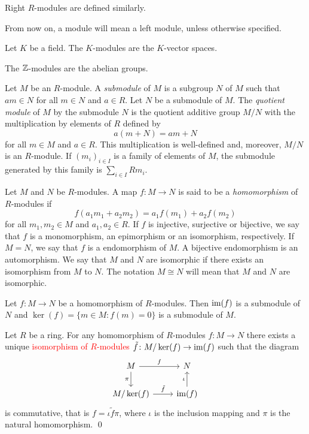 Right $R$-modules are defined similarly.

\begin{convention}
From now on, a module will mean a left module, unless otherwise specified. 
\end{convention}

\begin{example}
	Let $K$ be a field. The  $K$-modules are the $K$-vector spaces.
\end{example}

\begin{example}
    The $\mathbb{Z}$-modules are the abelian groups.
\end{example}

Let $M$ be an $R$-module. A {\em submodule} of $M$ is a subgroup $N$ of $M$
such that $am\in N$ for all $m\in N$ and $a\in R$. Let $N$ be a submodule of $M$. 
The {\em quotient module} 
of $M$ by the submodule $N$ is
the quotient additive group $M/N$ with the multiplication by elements of $R$ defined by
\[
a(m+N)=am+N
\]
for all $m\in M$ and $a\in R$.
This multiplication is well-defined and, moreover, 
$M/N$ is an $R$-module. 
If $(m_i)_{i\in I}$ is a family of elements of $M$, 
the submodule generated by this family is 
$\sum_{i \in I}Rm_i$.

Let $M$ and $N$ be $R$-modules. A map $f\colon M\rightarrow
N$ is said to be a {\em homomorphism} of $R$-modules if
\[
f(a_1m_1+a_2m_2)=a_1f(m_1)+a_2f(m_2)
\]
for all $m_1,m_2\in M$ and $a_1,a_2\in R$.
If $f$ is injective, surjective or bijective, we say that $f$ is
a monomorphism, an epimorphism or an isomorphism, respectively. If $M=N$, we say that
$f$ is a endomorphism of $M$. A bijective endomorphism is an
automorphism. We say that $M$ and $N$ are isomorphic if there exists 
an isomorphism from $M$ to $N$. The notation
$M\cong N$ will mean that $M$ and $N$ are isomorphic.

Let $f\colon M\rightarrow N$ be a homomorphism of $R$-modules. Then
$\operatorname{im}(f)$ is a submodule
of $N$ and $\ker(f)=\{m\in M:f(m)=0\}$ is a submodule of $M$.

 
\begin{theorem}
Let $R$ be a ring.	For any homomorphism of $R$-modules $f\colon M\rightarrow N$ 
there exists a unique \textcolor{red}{isomorphism of $R$-modules}  $\tilde f\colon M/\ker(f)\rightarrow\operatorname{im}(f)$ such that the diagram
	\[\begin{tikzcd}
		{M} & {N} \\
		{M/\ker(f)} & {\im(f)}
		\arrow["f", from=1-1, to=1-2]
		\arrow["{\pi}"', from=1-1, to=2-1]
		\arrow["{\iota}", from=2-2, to=1-2]
		\arrow["{\tilde f}", from=2-1, to=2-2]
	\end{tikzcd}
	\]
	is commutative, that is $f=\iota\tilde f\pi$, 
 where $\iota$ is the inclusion mapping and $\pi$ is the natural homomorphism. \qed	
\end{theorem} 


